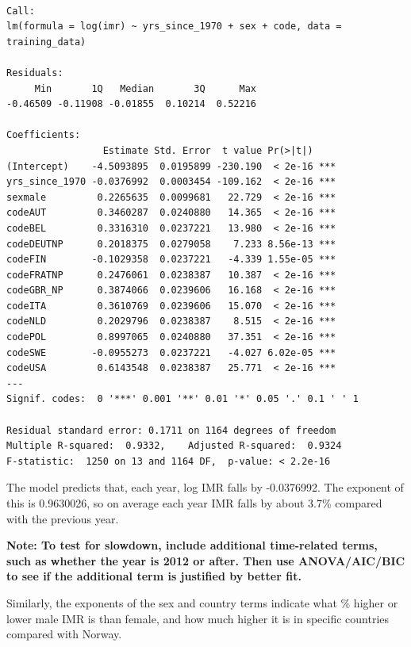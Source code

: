 \documentclass[
  letterpaper,
  DIV=11,
  numbers=noendperiod]{scrartcl}
\begin{document}
\begin{verbatim}

Call:
lm(formula = log(imr) ~ yrs_since_1970 + sex + code, data = training_data)

Residuals:
     Min       1Q   Median       3Q      Max 
-0.46509 -0.11908 -0.01855  0.10214  0.52216 

Coefficients:
                 Estimate Std. Error  t value Pr(>|t|)    
(Intercept)    -4.5093895  0.0195899 -230.190  < 2e-16 ***
yrs_since_1970 -0.0376992  0.0003454 -109.162  < 2e-16 ***
sexmale         0.2265635  0.0099681   22.729  < 2e-16 ***
codeAUT         0.3460287  0.0240880   14.365  < 2e-16 ***
codeBEL         0.3316310  0.0237221   13.980  < 2e-16 ***
codeDEUTNP      0.2018375  0.0279058    7.233 8.56e-13 ***
codeFIN        -0.1029358  0.0237221   -4.339 1.55e-05 ***
codeFRATNP      0.2476061  0.0238387   10.387  < 2e-16 ***
codeGBR_NP      0.3874066  0.0239606   16.168  < 2e-16 ***
codeITA         0.3610769  0.0239606   15.070  < 2e-16 ***
codeNLD         0.2029796  0.0238387    8.515  < 2e-16 ***
codePOL         0.8997065  0.0240880   37.351  < 2e-16 ***
codeSWE        -0.0955273  0.0237221   -4.027 6.02e-05 ***
codeUSA         0.6143548  0.0238387   25.771  < 2e-16 ***
---
Signif. codes:  0 '***' 0.001 '**' 0.01 '*' 0.05 '.' 0.1 ' ' 1

Residual standard error: 0.1711 on 1164 degrees of freedom
Multiple R-squared:  0.9332,    Adjusted R-squared:  0.9324 
F-statistic:  1250 on 13 and 1164 DF,  p-value: < 2.2e-16
\end{verbatim}

The model predicts that, each year, log IMR falls by -0.0376992. The
exponent of this is 0.9630026, so on average each year IMR falls by
about 3.7\% compared with the previous year.

\textbf{Note: To test for slowdown, include additional time-related
terms, such as whether the year is 2012 or after. Then use ANOVA/AIC/BIC
to see if the additional term is justified by better fit.}

Similarly, the exponents of the sex and country terms indicate what \%
higher or lower male IMR is than female, and how much higher it is in
specific countries compared with Norway.
\end{document}
